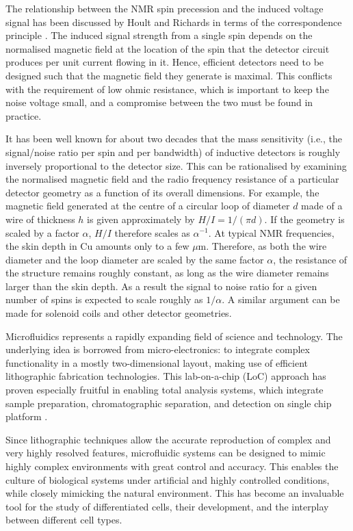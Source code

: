 The relationship 
between the NMR spin precession and the induced voltage signal has been discussed by Hoult and Richards 
in terms of the correspondence principle \cite{hoult1975cfd}. The  induced signal strength from a single spin depends on 
the normalised magnetic field at the location of the spin that the detector circuit produces per 
unit current flowing in it. 
Hence, efficient detectors need to be designed such that the magnetic field they generate is maximal. This conflicts with the requirement of low ohmic resistance, which is important to keep 
the noise voltage small, and a compromise between the two must be found in practice.

It has been well known for about two decades that the mass sensitivity (i.e., the signal/noise ratio 
per spin and per bandwidth) of inductive detectors is roughly inversely proportional to the detector size. This can be 
rationalised by examining the normalised magnetic field and the radio frequency resistance of a 
particular detector geometry as a function of its overall dimensions. For example, the magnetic field 
generated at the centre of a circular loop of diameter $d$ made of a wire of thickness $h$ is given approximately 
by $H/I=1/(\pi d)$. If the geometry is scaled by a factor $\alpha$, $H/I$ therefore scales as 
$\alpha^{-1}$. At typical NMR frequencies, the skin depth in Cu amounts only to a few $\mu$m. Therefore, 
as both the wire diameter and the loop diameter are scaled by the same factor $\alpha$, the 
resistance of the structure remains roughly constant, as long as the wire diameter remains larger than 
the skin depth. As a result the signal to noise ratio for a given number of spins is expected to scale roughly as $1/\alpha$. A 
similar argument can be made for solenoid coils and other detector geometries.

Microfluidics represents a rapidly expanding field of science and technology. The underlying idea is borrowed 
from micro-electronics: to integrate complex functionality in a mostly two-dimensional layout, making 
use of efficient lithographic fabrication technologies. This lab-on-a-chip (LoC) approach has proven 
especially fruitful in enabling total analysis systems, which integrate sample preparation, 
chromatographic separation, and detection on single chip platform \cite{Manz:1990vc}.

Since lithographic techniques allow the accurate reproduction of complex and very highly resolved 
features, microfluidic systems can be designed to mimic highly complex environments with great control 
and accuracy. This enables the culture of biological systems under artificial and highly controlled 
conditions, while closely mimicking the natural environment. This has become an invaluable tool for the 
study of  differentiated cells, their development, and the interplay between different cell types. 

